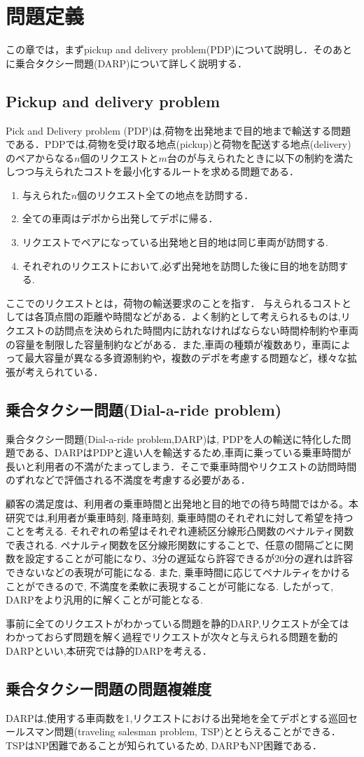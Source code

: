 \chapter{問題定義}\label{definition}
この章では，まずpickup and delivery problem(PDP)について説明し．そのあとに乗合タクシー問題(DARP)について詳しく説明する．
\section{Pickup and delivery problem}
Pick and Delivery problem (PDP)は,荷物を出発地まで目的地まで輸送する問題である．PDPでは,荷物を受け取る地点(pickup)と荷物を配送する地点(delivery)のペアからなる$n$個のリクエストと$m$台のが与えられたときに以下の制約を満たしつつ与えられたコストを最小化するルートを求める問題である．
\begin{enumerate}
 \item 与えられた$n$個のリクエスト全ての地点を訪問する．
 \item 全ての車両はデポから出発してデポに帰る．
 \item リクエストでペアになっている出発地と目的地は同じ車両が訪問する.
 \item それぞれのリクエストにおいて,必ず出発地を訪問した後に目的地を訪問する.
\end{enumerate}
ここでのリクエストとは，荷物の輸送要求のことを指す．
与えられるコストとしては各頂点間の距離や時間などがある．よく制約として考えられるものは,リクエストの訪問点を決められた時間内に訪れなければならない時間枠制約や車両の容量を制限した容量制約などがある．また,車両の種類が複数あり，車両によって最大容量が異なる多資源制約や，複数のデポを考慮する問題など，様々な拡張が考えられている．

\section{乗合タクシー問題(Dial-a-ride problem)}
乗合タクシー問題(Dial-a-ride problem,DARP)は, PDPを人の輸送に特化した問題である、DARPはPDPと違い人を輸送するため,車両に乗っている乗車時間が長いと利用者の不満がたまってしまう．そこで乗車時間やリクエストの訪問時間のずれなどで評価される不満度を考慮する必要がある．

顧客の満足度は、利用者の乗車時間と出発地と目的地での待ち時間ではかる。本研究では,利用者が乗車時刻, 降車時刻, 乗車時間のそれぞれに対して希望を持つことを考える. それぞれの希望はそれぞれ連続区分線形凸関数のペナルティ関数で表される. ペナルティ関数を区分線形関数にすることで、任意の間隔ごとに関数を設定することが可能になり、3分の遅延なら許容できるが20分の遅れは許容できないなどの表現が可能になる. また, 乗車時間に応じてペナルティをかけることができるので, 不満度を柔軟に表現することが可能になる. したがって, DARPをより汎用的に解くことが可能となる.

事前に全てのリクエストがわかっている問題を静的DARP,リクエストが全てはわかっておらず問題を解く過程でリクエストが次々と与えられる問題を動的DARPといい,本研究では静的DARPを考える．

\section{乗合タクシー問題の問題複雑度}
DARPは,使用する車両数を1,リクエストにおける出発地を全てデポとする巡回セールスマン問題(traveling salesman problem, TSP)ととらえることができる．TSPはNP困難\cite{TSP}であることが知られているため, DARPもNP困難である．
